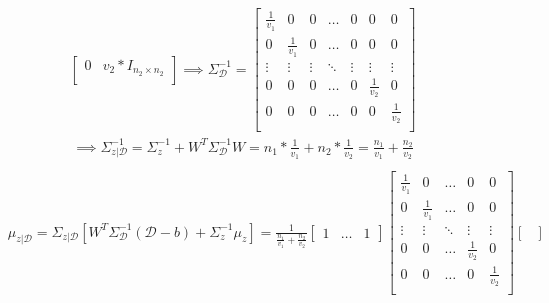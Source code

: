\documentclass[12pt]{article}
\begin{document}
\begin{qsolve}[solution]
\begin{align*}
\begin{bmatrix}
            0                       & v_2 * I_{n_2\times n_2} \\
        \end{bmatrix}
        \implies \Sigma_{\mathcal{D}}^{-1} = \begin{bmatrix}
            \frac{1}{v_1} & 0             & 0      & \hdots & 0      & 0             & 0             \\
            0             & \frac{1}{v_1} & 0      & \hdots & 0      & 0             & 0             \\
            \vdots        & \vdots        & \vdots & \ddots & \vdots & \vdots        & \vdots        \\
            0             & 0             & 0      & \hdots & 0      & \frac{1}{v_2} & 0             \\
            0             & 0             & 0      & \hdots & 0      & 0             & \frac{1}{v_2} \\
        \end{bmatrix}
    \end{align*}
    \begin{align*}
        \implies \Sigma_{z|\mathcal{D}}^{-1} = \Sigma_z^{-1} + W^T\Sigma_{\mathcal{D}}^{-1}W =n_1*\frac{1}{v_1} + n_2 * \frac{1}{v_2} = \frac{n_1}{v_1} + \frac{n_2}{v_2} \\
    \end{align*}
    \splitqsolve
    \begin{align*}
         & \mu_{z|\mathcal{D}} = \Sigma _{z|\mathcal{D}}[W^T\Sigma_{\mathcal{D}}^{-1}(\mathcal{D}-b)+\Sigma_z^{-1}\mu_z] = \frac{1}{\frac{n_1}{v_1} + \frac{n_2}{v_2}} \begin{bmatrix}
            1 & \hdots & 1
        \end{bmatrix}
        \begin{bmatrix}
            \frac{1}{v_1} & 0             & \hdots & 0             & 0             \\
            0             & \frac{1}{v_1} & \hdots & 0             & 0             \\
            \vdots        & \vdots        & \ddots & \vdots        & \vdots        \\
            0             & 0             & \hdots & \frac{1}{v_2} & 0             \\
            0             & 0             & \hdots & 0             & \frac{1}{v_2} \\
        \end{bmatrix}
        \begin{bmatrix}

\end{bmatrix}
\end{align*}
\end{qsolve}
\end{document}
